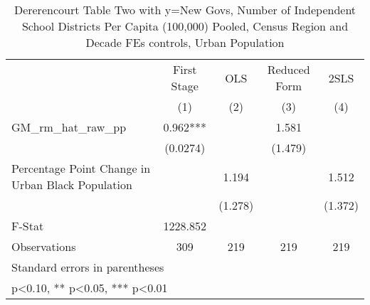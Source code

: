 \begin{table}[htbp]\centering
\def\sym#1{\ifmmode^{#1}\else\(^{#1}\)\fi}
\caption{Dererencourt Table Two with y=New Govs, Number of Independent School Districts Per Capita (100,000) Pooled, Census Region and Decade FEs controls, Urban Population}
\begin{tabular}{l*{4}{c}}
\toprule
                    & First Stage   &         OLS   &Reduced Form   &        2SLS   \\
                    &\multicolumn{1}{c}{(1)}   &\multicolumn{1}{c}{(2)}   &\multicolumn{1}{c}{(3)}   &\multicolumn{1}{c}{(4)}   \\
\midrule
GM\_rm\_hat\_raw\_pp    &       0.962***&               &       1.581   &               \\
                    &    (0.0274)   &               &     (1.479)   &               \\
\addlinespace
Percentage Point Change in Urban Black Population&               &       1.194   &               &       1.512   \\
                    &               &     (1.278)   &               &     (1.372)   \\
\midrule
F-Stat              &    1228.852   &               &               &               \\
Observations        &         309   &         219   &         219   &         219   \\
\bottomrule
\multicolumn{5}{l}{\footnotesize Standard errors in parentheses}\\
\multicolumn{5}{l}{\footnotesize * p<0.10, ** p<0.05, *** p<0.01}\\
\end{tabular}
\end{table}
